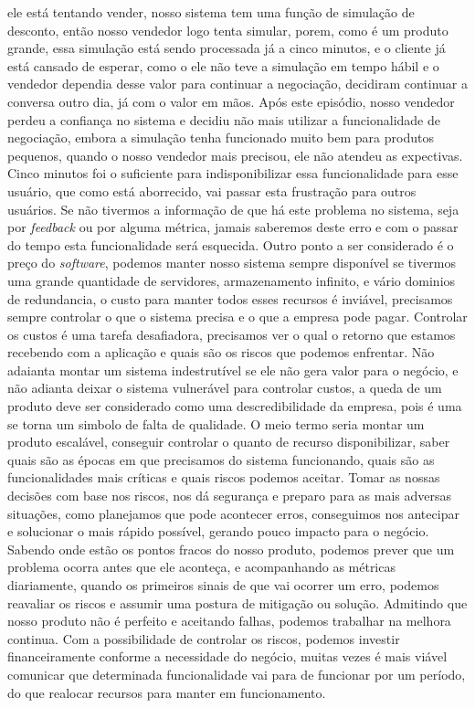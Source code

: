     ele está tentando vender, nosso sistema tem uma função de simulação de desconto,
    então nosso vendedor logo tenta simular, porem, como é um produto grande, essa
    simulação está sendo processada já a cinco minutos, e o cliente já está cansado
    de esperar, como o ele não teve a simulação em tempo hábil e o vendedor dependia
    desse valor para continuar a negociação, decidiram continuar a conversa outro dia,
    já com o valor em mãos. Após este episódio, nosso vendedor perdeu a confiança
    no sistema e decidiu não mais utilizar a funcionalidade de negociação, embora a
    simulação tenha funcionado muito bem para produtos pequenos, quando o nosso
    vendedor mais precisou, ele não atendeu as expectivas. Cinco minutos foi o
    suficiente para indisponibilizar essa funcionalidade para esse usuário, que
    como está aborrecido, vai passar esta frustração para outros usuários. Se não
    tivermos a informação de que há este problema no sistema, seja por \textit{feedback}
    ou por alguma métrica, jamais saberemos deste erro e com o passar do tempo
    esta funcionalidade será esquecida. \newline
    Outro ponto a ser considerado é o preço do \textit{software}, podemos manter
    nosso sistema sempre disponível se tivermos uma grande quantidade de servidores,
    armazenamento infinito, e vário dominios de redundancia, o custo para manter
    todos esses recursos é inviável, precisamos sempre controlar o que o sistema
    precisa e o que a empresa pode pagar. Controlar os custos é uma tarefa
    desafiadora, precisamos ver o qual o retorno que estamos recebendo com a aplicação
    e quais são os riscos que podemos enfrentar. Não adaianta montar um sistema
    indestrutível se ele não gera valor para o negócio, e não adianta deixar o
    sistema vulnerável para controlar custos, a queda de um produto deve ser
    considerado como uma descredibilidade da empresa, pois é uma se torna um
    simbolo de falta de qualidade. O meio termo seria montar um produto escalável,
    conseguir controlar o quanto de recurso disponibilizar, saber quais são as
    épocas em que precisamos do sistema funcionando, quais são as funcionalidades
    mais críticas e quais riscos podemos aceitar. Tomar as nossas decisões com
    base nos riscos, nos dá segurança e preparo para as mais adversas situações,
    como planejamos que pode acontecer erros, conseguimos nos antecipar e solucionar
    o mais rápido possível, gerando pouco impacto para o negócio. Sabendo onde estão
    os pontos fracos do nosso produto, podemos prever que um problema ocorra antes
    que ele aconteça, e acompanhando as métricas diariamente, quando os primeiros
    sinais de que vai ocorrer um erro, podemos reavaliar os riscos e assumir uma
    postura de mitigação ou solução. Admitindo que nosso produto não é perfeito e
    aceitando falhas, podemos trabalhar na melhora continua. Com a possibilidade
    de controlar os riscos, podemos investir financeiramente conforme a necessidade
    do negócio, muitas vezes é mais viável comunicar que determinada funcionalidade
    vai para de funcionar por um período, do que realocar recursos para manter em
    funcionamento.

